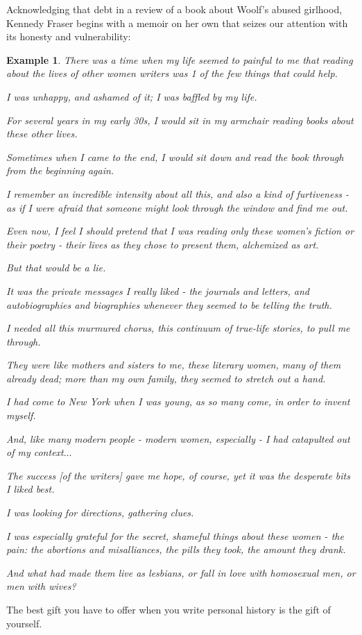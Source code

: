 \documentclass{book}
\numberwithin{equation}{section}
\newtheorem{example}{Example}[chapter]
\begin{document}
Acknowledging that debt in a review of a book about Woolf's abused girlhood, Kennedy Fraser begins with a memoir on her own that seizes our attention with its honesty and vulnerability:
\begin{example}
    There was a time when my life seemed to painful to me that reading about the lives of other women writers was 1 of the few things that could help.
    
    I was unhappy, and ashamed of it; I was baffled by my life.
    
    For several years in my early 30s, I would sit in my armchair reading books about these other lives.
    
    Sometimes when I came to the end, I would sit down and read the book through from the beginning again.
    
    I remember an incredible intensity about all this, and also a kind of furtiveness - as if I were afraid that someone might look through the window and find me out.
    
    Even now, I feel I should pretend that I was reading only these women's fiction or their poetry - their lives as they chose to present them, alchemized as art.
    
    But that would be a lie.
    
    It was the private messages I really liked - the journals and letters, and autobiographies and biographies whenever they seemed to be telling the truth.
    
    
    I needed all this murmured chorus, this continuum of true-life stories, to pull me through.
    
    They were like mothers and sisters to me, these literary women, many of them already dead; more than my own family, they seemed to stretch out a hand.
    
    I had come to New York when I was young, as so many come, in order to invent myself.
    
    And, like many modern people - modern women, especially - I had catapulted out of my context$\ldots$
    
    The success [of the writers] gave me hope, of course, yet it was the desperate bits I liked best.
    
    I was looking for directions, gathering clues.
    
    I was especially grateful for the secret, shameful things about these women - the pain: the abortions and misalliances, the pills they took, the amount they drank.
    
    And what had made them live as lesbians, or fall in love with homosexual men, or men with wives?
\end{example}
The best gift you have to offer when you write personal history is the gift of yourself.
\end{document}
